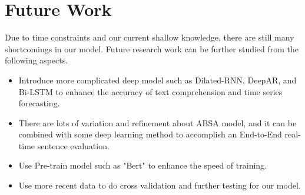 \documentclass[12pt]{article}  %
\begin{document}
\section{Future Work}
Due to time constraints and our current shallow knowledge, there are still many shortcomings in our model. Future research work can be further studied from the following aspects.
\begin{itemize}
    \item Introduce more complicated deep model such as Dilated-RNN, DeepAR, and Bi-LSTM to enhance the accuracy of text comprehension and time series forecasting.
    \item There are lots of variation and refinement about ABSA model, and it can be combined with some deep learning method to accomplish an End-to-End real-time sentence evaluation. 
    \item Use Pre-train model such as "Bert" to enhance the speed of training.
    \item Use more recent data to do cross validation and further testing for our model.
\end{itemize}
\end{document}
